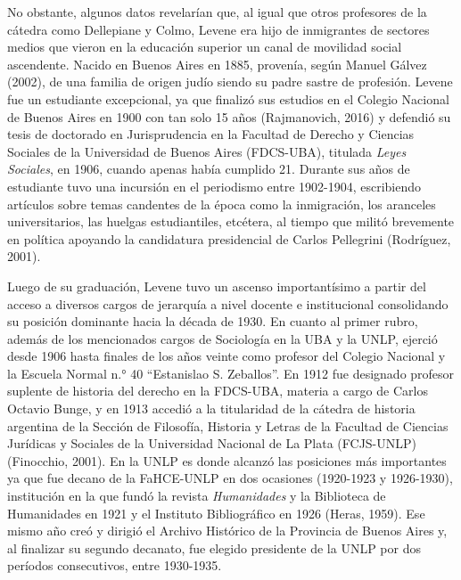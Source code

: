 No obstante, algunos datos revelarían que, al igual que otros profesores de la cátedra como Dellepiane y Colmo, Levene era hijo de inmigrantes de sectores medios que vieron en la educación superior un canal de movilidad social ascendente. Nacido en Buenos Aires en 1885, provenía, según Manuel Gálvez (2002), de una familia de origen judío siendo su padre sastre de profesión. Levene fue un estudiante excepcional, ya que finalizó sus estudios en el Colegio Nacional de Buenos Aires en 1900 con tan solo 15 años (Rajmanovich, 2016) y defendió su tesis de doctorado en Jurisprudencia en la Facultad de Derecho y Ciencias Sociales de la Universidad de Buenos Aires (FDCS-UBA), titulada \emph{Leyes Sociales}, en 1906, cuando apenas había cumplido 21. Durante sus años de estudiante tuvo una incursión en el periodismo entre 1902-1904, escribiendo artículos sobre temas candentes de la época como la inmigración, los aranceles universitarios, las huelgas estudiantiles, etcétera, al tiempo que militó brevemente en política apoyando la candidatura presidencial de Carlos Pellegrini (Rodríguez, 2001).

Luego de su graduación, Levene tuvo un ascenso importantísimo a partir del acceso a diversos cargos de jerarquía a nivel docente e institucional consolidando su posición dominante hacia la década de 1930. En cuanto al primer rubro, además de los mencionados cargos de Sociología en la UBA y la UNLP, ejerció desde 1906 hasta finales de los años veinte como profesor del Colegio Nacional y la Escuela Normal n.° 40 \enquote{Estanislao S. Zeballos}. En 1912 fue designado profesor suplente de historia del derecho en la FDCS-UBA, materia a cargo de Carlos Octavio Bunge, y en 1913 accedió a la titularidad de la cátedra de historia argentina de la Sección de Filosofía, Historia y Letras de la Facultad de Ciencias Jurídicas y Sociales de la Universidad Nacional de La Plata (FCJS-UNLP) (Finocchio, 2001). En la UNLP es donde alcanzó las posiciones más importantes ya que fue decano de la FaHCE-UNLP en dos ocasiones (1920-1923 y 1926-1930), institución en la que fundó la revista \emph{Humanidades} y la Biblioteca de Humanidades en 1921 y el Instituto Bibliográfico en 1926 (Heras, 1959). Ese mismo año creó y dirigió el Archivo Histórico de la Provincia de Buenos Aires y, al finalizar su segundo decanato, fue elegido presidente de la UNLP por dos períodos consecutivos, entre 1930-1935.

